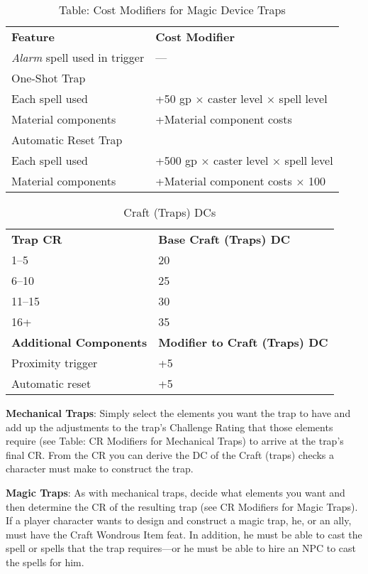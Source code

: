 \begin{table}[]
\sffamily
\caption{Table: Cost Modifiers for Magic Device Traps}
\begin{tabular}{ll}
\textbf{Feature} & \textbf{Cost Modifier}\\
\textit{Alarm} spell used in trigger & ---\\
One-Shot Trap \\
\hspace{1em} Each spell used & +50 gp $\times$ caster level $\times$ spell level\\
\hspace{1em} Material components & +Material component costs\\
Automatic Reset Trap \\
\hspace{1em} Each spell used & +500 gp $\times$ caster level $\times$ spell level\\
\hspace{1em} Material components & +Material component costs $\times$ 100\\
\end{tabular}
\end{table}

\begin{table}
 \sffamily
 \caption{Craft (Traps) DCs}
 \begin{tabular}{ll}
\textbf{Trap CR} & \textbf{Base Craft (Traps) DC} \\
1--5 & 20\\
6--10 & 25\\
11--15 & 30\\
16+ & 35\\
\textbf{Additional Components} & \textbf{Modifier to Craft (Traps) DC} \\
Proximity trigger & +5\\
Automatic reset & +5\\
 \end{tabular}

\end{table}

				
\textbf{Mechanical Traps}: Simply select the elements you want the trap to have and add up the adjustments to the trap's Challenge Rating that those elements require (see Table: CR Modifiers for Mechanical Traps) to arrive at the trap's final CR. From the CR you can derive the DC of the Craft (traps) checks a character must make to construct the trap.
				
\textbf{Magic Traps}: As with mechanical traps, decide what elements you want and then determine the CR of the resulting trap (see CR Modifiers for Magic Traps). If a player character wants to design and construct a magic trap, he, or an ally, must have the Craft Wondrous Item feat. In addition, he must be able to cast the spell or spells that the trap requires---or he must be able to hire an NPC to cast the spells for him.
				
